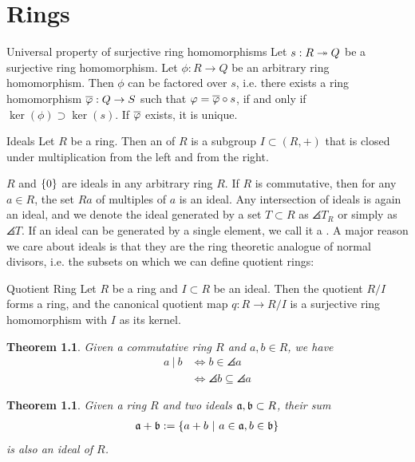\documentclass[10pt]{report}
\newtheorem{theorem}[lemma]{Theorem}
\theoremstyle{definition}
\begin{document}
	\chapter{Rings}
	\begin{importanttheorem}{Universal property of surjective ring homomorphisms}{}	
		Let $s : R \twoheadrightarrow Q$ be a surjective ring homomorphism. Let $\phi : R \to Q$ be an arbitrary ring homomorphism. Then $\phi$ can be factored over $s$, i.e.
		there exists a ring homomorphism $\overline{{\varphi}} : Q \to S$ such that $\varphi = \overline{{\varphi}} \circ s$, if and only if $\ker(\phi) \supset \ker(s)$. If $\overline{{\varphi}}$ exists, it is unique.
	\end{importanttheorem}
	\begin{importantdefinition}{Ideals}{}
		Let $R$ be a ring. Then an  of $R$ is a subgroup $I \subset (R,+)$ that is closed under multiplication from the left and from the right.
	\end{importantdefinition}
	$R$ and $\qty{0}$ are ideals in any arbitrary ring $R$.
	If $R$ is commutative, then for any $a \in R$, the set $Ra$ of multiples of $a$ is an ideal. Any intersection of ideals is again an ideal, and we denote the ideal generated by a set $T \subset R$ as $\angles{T}_R$ or simply as $\angles{T}$. If an ideal can be generated by a single element, we call it a .
	\newpar
	A major reason we care about ideals is that they are the ring theoretic analogue of normal divisors, i.e. the subsets on which we can define quotient rings:
	\begin{importanttheorem}{Quotient Ring}{}
		Let $R$ be a ring and $I \subset R$ be an ideal. Then the quotient $R/I$ forms a ring, and the canonical quotient map $q : R \to R/I$ is a surjective ring homomorphism with $I$ as its kernel.
	\end{importanttheorem}
	\begin{theorem}
		Given a commutative ring $R$ and $a,b \in R$, we have
		\begin{align*}
			a ~|~ b 
			&\Leftrightarrow b \in \angles{a}\\
			&\Leftrightarrow \angles{b} \subseteq \angles{a}
		\end{align*}
	\end{theorem}
	\begin{theorem}
		Given a ring $R$ and two ideals $\mathfrak{a},\mathfrak{b} \subset R$, their sum
		\begin{align*}
			\mathfrak{a} + \mathfrak{b} := \qty{a + b ~\middle|~a \in \mathfrak{a}, b \in \mathfrak{b}}
		\end{align*} 
		is also an ideal of $R$.
	\end{theorem}
\end{document}
